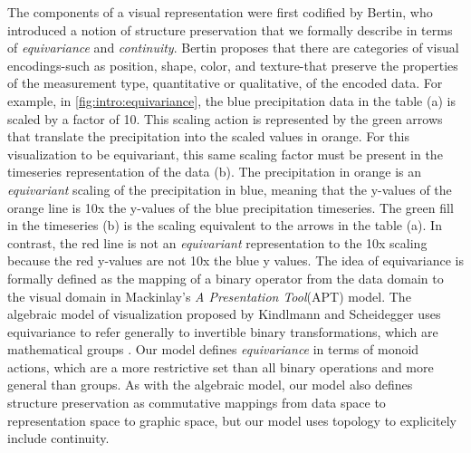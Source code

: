 \documentclass[../main.tex]{subfiles}
\begin{document}
The components of a visual representation were first codified by Bertin\cite{bertinSemiologyGraphicsDiagrams2011a}, who introduced a notion of structure preservation that we formally describe in terms of \textit{equivariance} and \textit{continuity}. Bertin proposes that there are categories of visual encodings-such as position, shape, color, and texture-that preserve the properties of the measurement type, quantitative or qualitative, of the encoded data. For example, in \autoref{fig:intro:equivariance}, the blue precipitation data in the table (a) is scaled by a factor of 10. This scaling action is represented by the green arrows that translate the precipitation into the scaled values in orange. For this visualization to be equivariant, this same scaling factor must be present in the timeseries representation of the data (b). The precipitation in orange is an \textit{equivariant} scaling of the precipitation in blue, meaning that the y-values of the orange line is 10x the y-values of the blue precipitation timeseries. The green fill in the timeseries (b) is the scaling equivalent to the arrows in the table (a). In contrast, the red line is not an \textit{equivariant} representation to the 10x scaling because the red y-values are not 10x the blue y values. The idea of equivariance is formally defined as the mapping of a binary operator from the data domain to the visual domain in Mackinlay's \textit{A Presentation Tool}(APT) model\cite{mackinlayAutomatingDesignGraphical1986, mackinlayAutomaticDesignGraphical1987}. The algebraic model of visualization proposed by Kindlmann and Scheidegger uses equivariance to refer generally to invertible binary transformations\cite{kindlmannAlgebraicProcessVisualization2014}, which are mathematical groups \cite{shadrachIntroductionGroups2017}. Our model defines \textit{equivariance} in terms of monoid actions, which are a more restrictive set than all binary operations and more general than groups. As with the algebraic model, our model also defines structure preservation as commutative mappings from data space to representation space to graphic space, but our model uses topology to explicitely include continuity.
\end{document}

